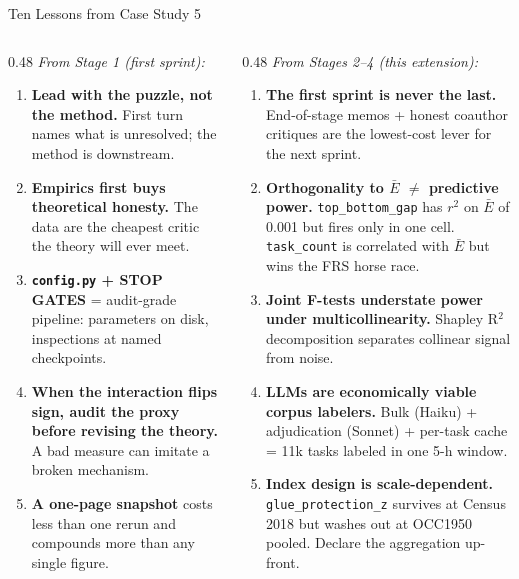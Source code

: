 \documentclass[10pt,english,aspectratio=169]{beamer}
\begin{document}
\begin{frame}{Ten Lessons from Case Study 5}
\scriptsize
\begin{columns}[T]
\begin{column}{0.48\textwidth}
\textit{From Stage 1 (first sprint):}
\begin{enumerate}\scriptsize
  \item \textbf{Lead with the puzzle, not the method.} First turn names what is unresolved; the method is downstream.
  \item \textbf{Empirics first buys theoretical honesty.} The data are the cheapest critic the theory will ever meet.
  \item \textbf{\texttt{config.py} + STOP GATES} = audit-grade pipeline: parameters on disk, inspections at named checkpoints.
  \item \textbf{When the interaction flips sign, audit the proxy before revising the theory.} A bad measure can imitate a broken mechanism.
  \item \textbf{A one-page snapshot} costs less than one rerun and compounds more than any single figure.
\end{enumerate}
\end{column}
\begin{column}{0.48\textwidth}
\textit{From Stages 2--4 (this extension):}
\begin{enumerate}\scriptsize
  \setcounter{enumi}{5}
  \item \textbf{The first sprint is never the last.} End-of-stage memos + honest coauthor critiques are the lowest-cost lever for the next sprint.
  \item \textbf{Orthogonality to $\bar E$ $\neq$ predictive power.} \texttt{top\_bottom\_gap} has $r^2$ on $\bar E$ of 0.001 but fires only in one cell. \texttt{task\_count} is correlated with $\bar E$ but wins the FRS horse race.
  \item \textbf{Joint F-tests understate power under multicollinearity.} Shapley R$^2$ decomposition separates collinear signal from noise.
  \item \textbf{LLMs are economically viable corpus labelers.} Bulk (Haiku) + adjudication (Sonnet) + per-task cache = 11k tasks labeled in one 5-h window.
  \item \textbf{Index design is scale-dependent.} \texttt{glue\_protection\_z} survives at Census 2018 but washes out at OCC1950 pooled. Declare the aggregation up-front.
\end{enumerate}
\end{column}
\end{columns}


\end{frame}
\end{document}
